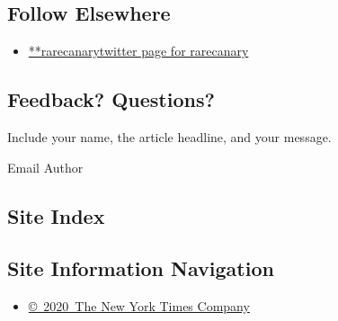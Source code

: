 \hypertarget{follow-elsewhere}{%
\subsection{Follow Elsewhere}\label{follow-elsewhere}}

\begin{itemize}
\tightlist
\item
  \href{https://twitter.com/rarecanary}{**rarecanarytwitter page for
  rarecanary}
\end{itemize}

\hypertarget{feedback-questions}{%
\subsection{Feedback? Questions?}\label{feedback-questions}}

Include your name, the article headline, and your message.

Email Author

\hypertarget{site-index}{%
\subsection{Site Index}\label{site-index}}

\hypertarget{site-information-navigation}{%
\subsection{Site Information
Navigation}\label{site-information-navigation}}

\begin{itemize}
\tightlist
\item
  \href{https://help.nytimes3xbfgragh.onion/hc/en-us/articles/115014792127-Copyright-notice}{©~2020~The
  New York Times Company}
\end{itemize}

